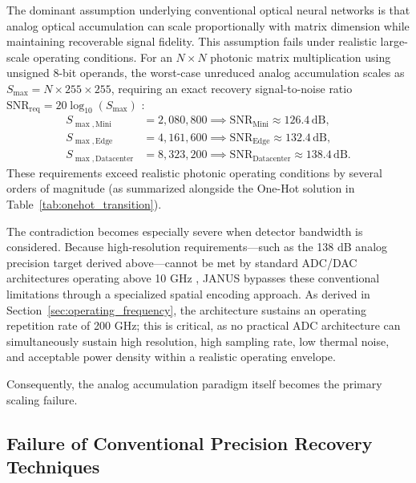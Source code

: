 \documentclass[journal]{IEEEtran}
\begin{document}
The dominant assumption underlying conventional optical neural networks is that analog optical accumulation can scale proportionally with matrix dimension while maintaining recoverable signal fidelity. This assumption fails under realistic large-scale operating conditions.
For an $N \times N$ photonic matrix multiplication using unsigned 8-bit operands, the worst-case unreduced analog accumulation scales as $S_{\max} = N \times 255 \times 255$, requiring an exact recovery signal-to-noise ratio $\mathrm{SNR}_{\mathrm{req}} = 20\log_{10}(S_{\max})$ \cite{Winzer2006,Saleh2019}:
\begin{equation}
\begin{aligned}
S_{\max,\mathrm{Mini}} &= 2{,}080{,}800 \implies \mathrm{SNR}_{\mathrm{Mini}} \approx 126.4\,\mathrm{dB}, \\
S_{\max,\mathrm{Edge}} &= 4{,}161{,}600 \implies \mathrm{SNR}_{\mathrm{Edge}} \approx 132.4\,\mathrm{dB}, \\
S_{\max,\mathrm{Datacenter}} &= 8{,}323{,}200 \implies \mathrm{SNR}_{\mathrm{Datacenter}} \approx 138.4\,\mathrm{dB}.
\end{aligned}
\label{eq:analog_snr_scaling}
\end{equation}
These requirements exceed realistic photonic operating conditions by several orders of magnitude (as summarized alongside the One-Hot solution in Table~\ref{tab:onehot_transition}).

The contradiction becomes especially severe when detector bandwidth is considered. Because high-resolution requirements---such as the 138 dB analog precision target derived above---cannot be met by standard ADC/DAC architectures operating above 10 GHz , JANUS bypasses these conventional limitations through a specialized spatial encoding approach. As derived in Section~\ref{sec:operating_frequency}, the architecture sustains an operating repetition rate of 200 GHz; this is critical, as no practical ADC architecture can simultaneously sustain high resolution, high sampling rate, low thermal noise, and acceptable power density within a realistic operating envelope.

Consequently, the analog accumulation paradigm itself becomes the primary scaling failure.

\subsection{\textbf{Failure of Conventional Precision Recovery Techniques}}
\end{document}
